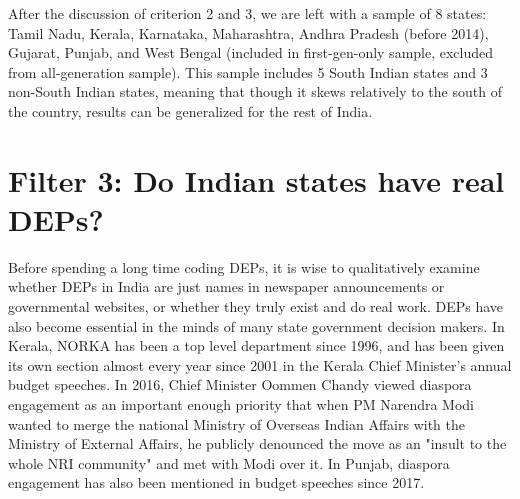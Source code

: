 \documentclass[doublespace,nopageskip]{UVAthesis}
\begin{document}
After the discussion of criterion 2 and 3, we are left with a sample of 8 states: Tamil Nadu, Kerala, Karnataka, Maharashtra, Andhra Pradesh (before 2014), Gujarat, Punjab, and West Bengal (included in first-gen-only sample, excluded from all-generation sample). This sample includes 5 South Indian states and 3 non-South Indian states, meaning that though it skews relatively to the south of the country, results can be generalized for the rest of India.

\section{Filter 3: Do Indian states have real DEPs?}\label{ss:are there deps}
    Before spending a long time coding DEPs, it is wise to qualitatively examine whether DEPs in India are just names in newspaper announcements or governmental websites, or whether they truly exist and do real work. 
   DEPs have also become essential in the minds of many state government decision makers. In Kerala, NORKA has been a top level department since 1996, and has been given its own section almost every year since 2001 in the Kerala Chief Minister's annual budget speeches. In 2016, Chief Minister Oommen Chandy viewed diaspora engagement as an important enough priority that when PM Narendra Modi wanted to merge the national Ministry of Overseas Indian Affairs with the Ministry of External Affairs, he publicly denounced the move as an "insult to the whole NRI community" and met with Modi over it\citep{noauthor_kerala_2016}. In Punjab, diaspora engagement has also been mentioned in budget speeches since 2017. 
\end{document}
